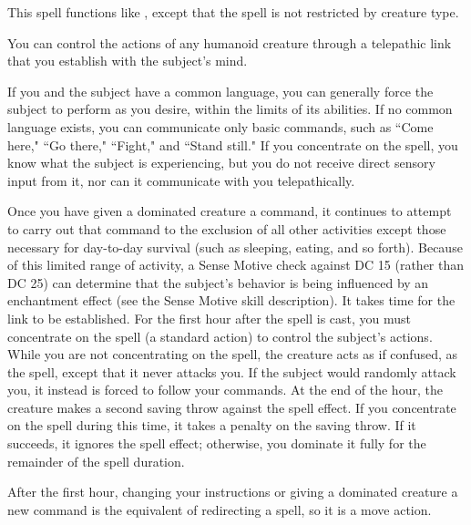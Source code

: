 \begin{spelleffect}
  This spell functions like , except that the spell is not restricted by creature type.
\end{spelleffect}

\spellrng{\rngclose}
\begin{spelleffect}
  You can control the actions of any humanoid creature through a telepathic link that you establish with the subject's mind.
  \par If you and the subject have a common language, you can generally force the subject to perform as you desire, within the limits of its abilities. If no common language exists, you can communicate only basic commands, such as ``Come here," ``Go there," ``Fight," and ``Stand still." If you concentrate on the spell, you know what the subject is experiencing, but you do not receive direct sensory input from it, nor can it communicate with you telepathically.
  \par Once you have given a dominated creature a command, it continues to attempt to carry out that command to the exclusion of all other activities except those necessary for day-to-day survival (such as sleeping, eating, and so forth). Because of this limited range of activity, a Sense Motive check against DC 15 (rather than DC 25) can determine that the subject's behavior is being influenced by an enchantment effect (see the Sense Motive skill description).
  It takes time for the link to be established. For the first hour after the spell is cast, you must concentrate on the spell (a standard action) to control the subject's actions. While you are not concentrating on the spell, the creature acts as if confused, as the  spell, except that it never attacks you. If the subject would randomly attack you, it instead is forced to follow your commands. At the end of the hour, the creature makes a second saving throw against the spell effect. If you concentrate on the spell during this time, it takes a  penalty on the saving throw. If it succeeds, it ignores the spell effect; otherwise, you dominate it fully for the remainder of the spell duration.
  \par After the first hour, changing your instructions or giving a dominated creature a new command is the equivalent of redirecting a spell, so it is a move action.

\end{spelleffect}
